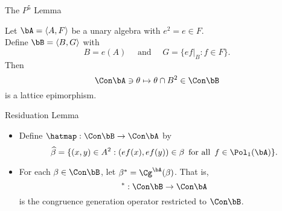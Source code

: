 \documentclass[xcolor=dvipsnames,9pt,hide notes]{beamer}
\begin{document}
\begin{frame}[fragile,label=PAP,shrink=5]{The $P^5$ Lemma}
  \begin{lemma}[\PAP]
    Let $\bA = \langle A, F\rangle$ be a unary algebra with 
    $e^2=e\in F$.\\[4pt]
    Define $\bB = \langle B, G\rangle$ with
    \[
    B= e(A) \quad \text{ and } \quad G = \{ef\rvert_B : f\in F\}.
    \]
    Then 
    \[
    \Con \bA \ni \theta \mapsto \theta \cap B^2 \in \Con \bB
    \]
    is a lattice epimorphism.
  \end{lemma}
\end{frame}


\begin{frame}[fragile,label=PAP1,shrink=5]{Residuation Lemma}  %
\vskip3mm

  \begin{itemize}
  \item Define $\hatmap : \Con\bB \rightarrow \Con\bA$ by %
    \[
    \widehat{\beta} = \{(x,y) \in A^2 : (ef(x), ef(y))\in \beta\, \text{ for all }\, f\in \Pol_1(\bA) \}.
    \]
  \item<2->
    For each $\beta \in \Con\bB$, let $\beta^* = \Cg^\bA(\beta)$.  That is,
    \[
    ^*: \Con\bB \rightarrow \Con\bA
    \]
    is the congruence generation operator restricted to $\Con\bB$.
  \end{itemize}
\end{frame}
\end{document}
